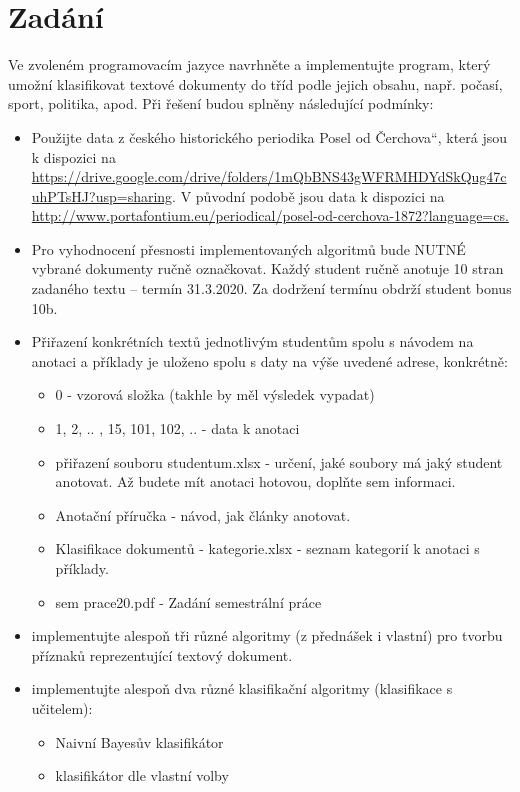 \documentclass[ 12pt, a4paper]{article}
\begin{document}
\section{Zadání}
Ve zvoleném programovacím jazyce navrhněte a implementujte program, který umožní klasifikovat textové dokumenty do tříd podle jejich obsahu, např. počasí, sport, politika, apod. Při řešení budou splněny následující podmínky:
\begin{itemize}
	
\item Použijte data z českého historického periodika Posel od Čerchova“, která jsou k dispozici na \url{https://drive.google.com/drive/folders/1mQbBNS43gWFRMHDYdSkQug47cuhPTsHJ?usp=sharing}. V původní podobě jsou data k dispozici na \url{http://www.portafontium.eu/periodical/posel-od-cerchova-1872?language=cs.}

\item Pro vyhodnocení přesnosti implementovaných algoritmů bude NUTNÉ vybrané dokumenty ručně označkovat. Každý student ručně anotuje 10 stran zadaného textu –
termín 31.3.2020. Za dodržení termínu obdrží student bonus 10b.

\item Přiřazení konkrétních textů jednotlivým studentům spolu s návodem na anotaci a příklady je uloženo spolu s daty na výše uvedené adrese, konkrétně:
	\begin{itemize}
	\item 0 - vzorová složka (takhle by měl výsledek vypadat)
	\item 1, 2, .. , 15, 101, 102, .. - data k anotaci
	\item přiřazení souboru studentum.xlsx - určení, jaké soubory má jaký student	anotovat. Až budete mít anotaci hotovou, doplňte sem informaci.
	\item Anotační příručka - návod, jak články anotovat.
	\item Klasifikace dokumentů - kategorie.xlsx - seznam kategorií k anotaci s příklady.
	\item sem prace20.pdf - Zadání semestrální práce
	\end{itemize}

\item implementujte alespoň tři různé algoritmy (z přednášek i vlastní) pro tvorbu příznaků reprezentující textový dokument.

\item implementujte alespoň dva různé klasifikační algoritmy (klasifikace s učitelem):
	\begin{itemize}
	\item Naivní Bayesův klasifikátor
	\item klasifikátor dle vlastní volby
	\end{itemize}


\end{itemize}
\end{document}

